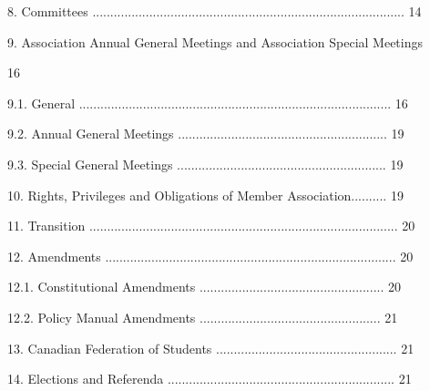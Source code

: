 8.     Committees ........................................................................................ 14  



9.     Association Annual General Meetings and  Association Special Meetings 

        16  



   9.1.        General ........................................................................................ 16  



   9.2.        Annual General Meetings ........................................................... 19  



   9.3.        Special General Meetings ........................................................... 19  



10.        Rights, Privileges and Obligations of Member Association.......... 19  



11.        Transition ....................................................................................... 20  



12.        Amendments .................................................................................. 20  



    12.1.         Constitutional Amendments .................................................... 20  



    12.2.         Policy Manual Amendments ................................................... 21  



13.        Canadian Federation of Students ................................................... 21  



14.        Elections and Referenda ................................................................ 21  



  



  



  



  



